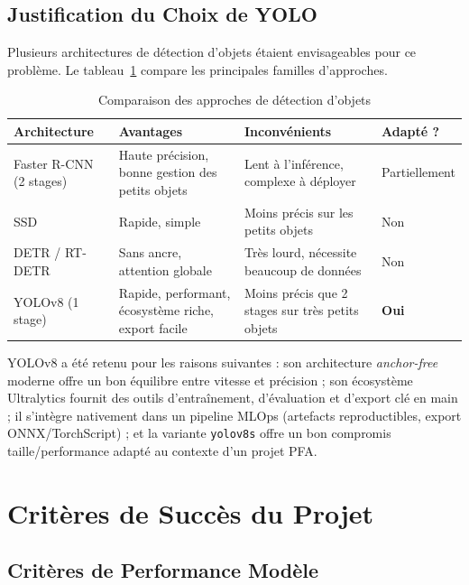 \documentclass{rapportENSIAS}
\begin{document}
\subsection{Justification du Choix de YOLO}

Plusieurs architectures de détection d'objets étaient envisageables pour ce problème. Le tableau~\ref{tab:architectures_comparaison} compare les principales familles d'approches.

\begin{table}[H]
\centering
\caption{Comparaison des approches de détection d'objets}
\label{tab:architectures_comparaison}
\begin{tabular}{p{3cm} p{4cm} p{4cm} p{2.5cm}}
\toprule
\textbf{Architecture} & \textbf{Avantages} & \textbf{Inconvénients} & \textbf{Adapté ?} \\
\midrule
Faster R-CNN (2 stages) & Haute précision, bonne gestion des petits objets & Lent à l'inférence, complexe à déployer & Partiellement \\
\midrule
SSD & Rapide, simple & Moins précis sur les petits objets & Non \\
\midrule
DETR / RT-DETR & Sans ancre, attention globale & Très lourd, nécessite beaucoup de données & Non \\
\midrule
YOLOv8 (1 stage) & Rapide, performant, écosystème riche, export facile & Moins précis que 2 stages sur très petits objets & \textbf{Oui} \\
\bottomrule
\end{tabular}
\end{table}

YOLOv8 a été retenu pour les raisons suivantes : son architecture \textit{anchor-free} moderne offre un bon équilibre entre vitesse et précision ; son écosystème Ultralytics fournit des outils d'entraînement, d'évaluation et d'export clé en main ; il s'intègre nativement dans un pipeline MLOps (artefacts reproductibles, export ONNX/TorchScript) ; et la variante \texttt{yolov8s} offre un bon compromis taille/performance adapté au contexte d'un projet PFA.

\section{Critères de Succès du Projet}

\subsection{Critères de Performance Modèle}
\end{document}
